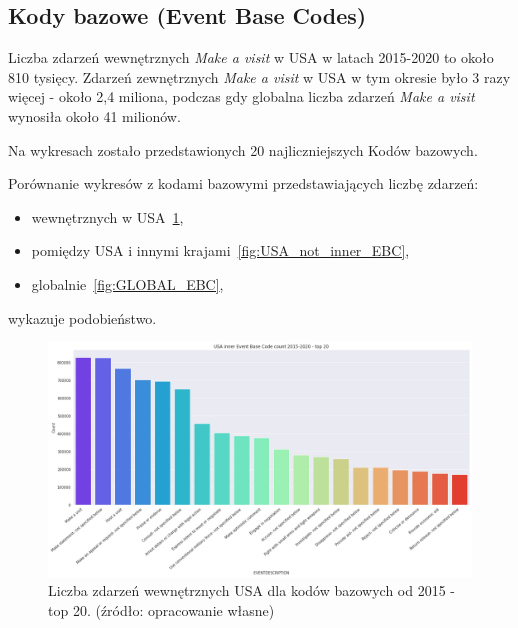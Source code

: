 \documentclass[11pt]{report}
\begin{document}
    \subsection{Kody bazowe (Event Base Codes)}\label{subsec:kody-bazowenullevent-base-codesnull}

    Liczba zdarzeń wewnętrznych \textit{Make a visit} w USA w latach 2015-2020 to około 810 tysięcy.
    Zdarzeń zewnętrznych \textit{Make a visit} w USA w tym okresie było 3 razy więcej - około 2,4 miliona,
    podczas gdy globalna liczba zdarzeń \textit{Make a visit} wynosiła około 41 milionów.

    Na wykresach zostało przedstawionych 20 najliczniejszych Kodów bazowych.

    Porównanie wykresów z kodami bazowymi przedstawiających liczbę zdarzeń:
    \begin{itemize}
        \item wewnętrznych w USA~\ref{fig:USA_inner_EBC},
        \item pomiędzy USA i innymi krajami~\ref{fig:USA_not_inner_EBC},
        \item globalnie~\ref{fig:GLOBAL_EBC},
    \end{itemize}
    wykazuje podobieństwo.

    \begin{figure}[!htp]
        \centering
        \includegraphics[width=\linewidth]{fig/USA inner/EBC.png}
        \caption{Liczba zdarzeń wewnętrznych USA dla kodów bazowych od 2015 - top 20. (źródło: opracowanie własne)}
        \label{fig:USA_inner_EBC}
    \end{figure}
\end{document}
